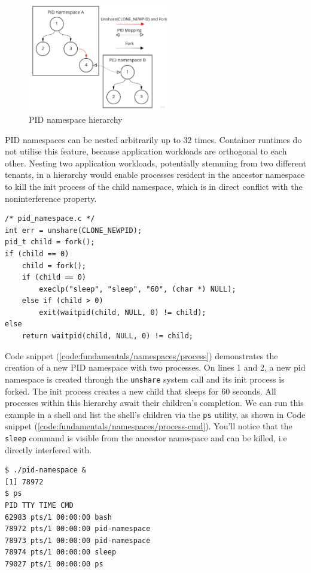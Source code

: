 \begin{figure}[H]
    \centering
    \includegraphics[width=0.55\textwidth]{images/fundamentals/pid-namespace-hierarchy.jpg}
    \caption{PID namespace hierarchy}
    \label{images:fundamentals/pid-namespace-hierarchy.jpg}
\end{figure}

PID namespaces can be nested arbitrarily up to 32 times. 
Container runtimes do not utilise this feature, because application workloads are orthogonal 
to each other. Nesting two application workloads, potentially stemming from two different tenants, in a hierarchy
would enable processes resident in the ancestor namespace to kill the init process of the child namespace, which 
is in direct conflict with the noninterference property. 

\begin{lstlisting}[style=c-code-snippets, label={code:fundamentals/namespaces/process}, caption={PID namespace creation pseudocode}]
/* pid_namespace.c */
int err = unshare(CLONE_NEWPID);
pid_t child = fork();
if (child == 0) 
    child = fork();
    if (child == 0)
        execlp("sleep", "sleep", "60", (char *) NULL);
    else if (child > 0)
        exit(waitpid(child, NULL, 0) != child);
else 
    return waitpid(child, NULL, 0) != child;
\end{lstlisting}

Code snippet (\ref{code:fundamentals/namespaces/process}) demonstrates the creation of a new 
PID namespace with two processes. On lines 1 and 2, a new 
pid namespace is created through the \verb|unshare| system call and its init process is forked. 
The init process creates a new child that sleeps for 60 seconds. All processes within this 
hierarchy await their children's completion. 
We can run this example in a shell and list the shell's children via the \verb|ps|
utility, as shown in Code snippet (\ref{code:fundamentals/namespaces/process-cmd}). 
You'll notice that the \verb|sleep| command is visible from the ancestor namespace and can be killed,
i.e directly interfered with. 
\begin{lstlisting}[label={code:fundamentals/namespaces/process-cmd}, style=bash, caption={Example of creating a PID namespace and listing all processes in the child namespace from a process in the parent namespace}]
$ ./pid-namespace &
[1] 78972
$ ps
PID TTY TIME CMD
62983 pts/1 00:00:00 bash
78972 pts/1 00:00:00 pid-namespace
78973 pts/1 00:00:00 pid-namespace
78974 pts/1 00:00:00 sleep
79027 pts/1 00:00:00 ps
\end{lstlisting}

